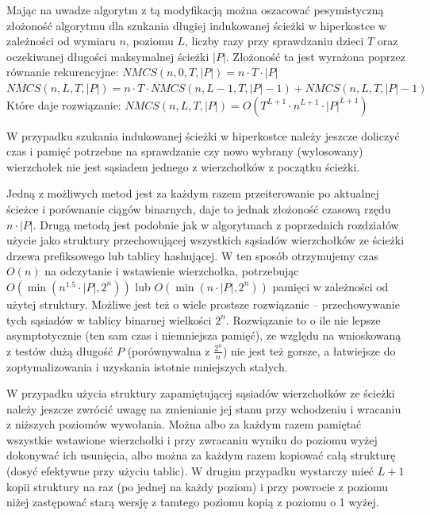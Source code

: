 \documentclass{pracamgr}
\begin{document}
     Mając na uwadze algorytm z tą modyfikacją można oszacować pesymistyczną złożoność algorytmu dla szukania długiej indukowanej ścieżki w hiperkostce
     w zależności od wymiaru $n$, poziomu $L$, liczby razy przy sprawdzaniu dzieci $T$ oraz oczekiwanej długości maksymalnej ścieżki $|P|$.
     Złożoność ta jest wyrażona poprzez równanie rekurencyjne:\newline
     $NMCS(n,0,T,|P|)=n\cdot T\cdot |P|$\newline
     $NMCS(n,L,T,|P|)=n\cdot T\cdot NMCS(n,L-1,T,|P|-1)+NMCS(n,L,T,|P|-1)$\newline
     Które daje rozwiązanie:\newline
     $NMCS(n,L,T,|P|)=O(T^{L+1}\cdot n^{L+1}\cdot|P|^{L+1})$     
     
     W przypadku szukania indukowanej ścieżki w hiperkostce należy jeszcze doliczyć czas i pamięć potrzebne na sprawdzanie czy nowo wybrany (wylosowany)
     wierzchołek nie jest sąsiadem jednego z wierzchołków z początku ścieżki.
     
     Jedną z możliwych metod jest za każdym razem przeiterowanie po aktualnej ścieżce i porównanie ciągów binarnych, daje to jednak złożoność
     czasową rzędu $n\cdot |P|$. Drugą metodą jest podobnie jak w algorytmach z poprzednich rozdziałów użycie jako struktury przechowującej wszystkich sąsiadów
     wierzchołków ze ścieżki drzewa prefiksowego lub tablicy hashującej. W ten sposób otrzymujemy czas $O(n)$ na odczytanie i wstawienie wierzchołka,
     potrzebując $O(\min(n^{1.5}\cdot|P|,2^n))$ lub $O(\min(n\cdot|P|,2^n))$ pamięci w zależności od użytej struktury.
     Możliwe jest też o wiele prostsze rozwiązanie -- przechowywanie tych sąsiadów w tablicy binarnej wielkości $2^n$.
     Rozwiązanie to o ile nie lepsze asymptotycznie (ten sam czas i niemniejsza pamięć),
     ze względu na wnioskowaną z testów dużą długość $P$ (porównywalna z $\frac{2^n}{n}$) nie jest też gorsze,
     a łatwiejsze do zoptymalizowania i uzyskania istotnie mniejszych stałych.
     
     W przypadku użycia struktury zapamiętującej sąsiadów wierzchołków ze ścieżki należy jeszcze zwrócić uwagę na zmienianie jej stanu przy wchodzeniu
     i wracaniu z niższych poziomów wywołania. Można albo za każdym razem pamiętać wszystkie wstawione wierzchołki i przy zwracaniu wyniku
     do poziomu wyżej dokonywać ich usunięcia, albo można za każdym razem kopiować całą strukturę (dosyć efektywne przy użyciu tablic).
     W drugim przypadku wystarczy mieć $L+1$ kopii struktury na raz (po jednej na każdy poziom) i przy powrocie z poziomu niżej
     zastępować starą wersję z tamtego poziomu kopią z poziomu o 1 wyżej.
     
\end{document}
